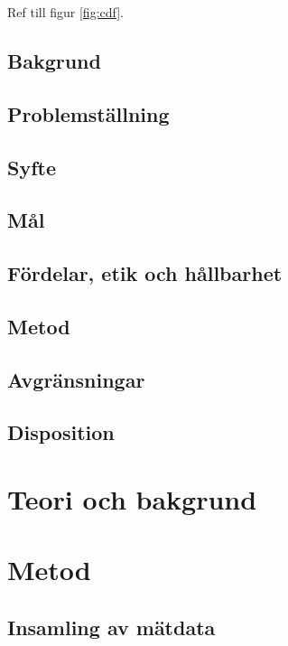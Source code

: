 
Ref till figur \ref{fig:cdf}.


\subsection{Bakgrund}

\subsection{Problemställning}

\subsection{Syfte}

\subsection{Mål}

\subsection{Fördelar, etik och hållbarhet}

\subsection{Metod}

\subsection{Avgränsningar}

\subsection{Disposition}

\clearpage
\section{Teori och bakgrund}

\clearpage
\section{Metod}

\subsection{Insamling av mätdata}

